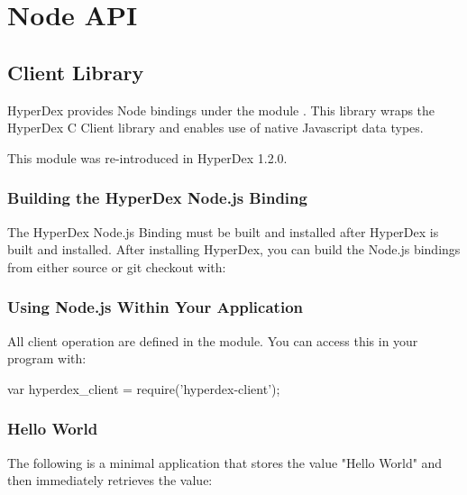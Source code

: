 \chapter{Node API}
\label{chap:api:node}

\section{Client Library}
\label{sec:api:node:client}

HyperDex provides Node bindings under the module .  This
library wraps the HyperDex C Client library and enables use of native Javascript
data types.

This module was re-introduced in HyperDex 1.2.0.

\subsection{Building the HyperDex Node.js Binding}
\label{sec:api:node:building}

The HyperDex Node.js Binding must be built and installed after HyperDex is built
and installed.  After installing HyperDex, you can build the Node.js bindings
from either source or git checkout with:

\begin{consolecode}
\end{consolecode}

\subsection{Using Node.js Within Your Application}
\label{sec:api:node:using}

All client operation are defined in the  module.  You can
access this in your program with:

\begin{javascriptcode}
var hyperdex_client = require('hyperdex-client');
\end{javascriptcode}

\subsection{Hello World}
\label{sec:api:node:hello-world}

The following is a minimal application that stores the value "Hello World" and
then immediately retrieves the value:

\inputminted{javascript}{\topdir/api/node.js/hello-world.js}

